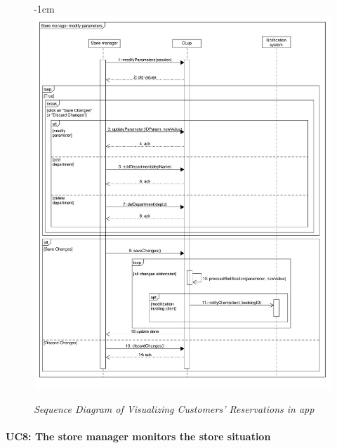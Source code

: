 \documentclass{article}
\begin{document}
\begin{center}
							\begin{figure}[!h]
								\begin{adjustwidth} {-1cm}{}
									\centering
									\includegraphics[scale=0.385]{SD/7_modifyParameters.pdf}\\
									\caption{\emph{Sequence Diagram of Visualizing Customers' Reservations in app}}
								\end{adjustwidth}
							\end{figure}
				\end{center}



			\newpage
			
			\paragraph{UC8: The store manager monitors the store situation}
			
\end{document}
